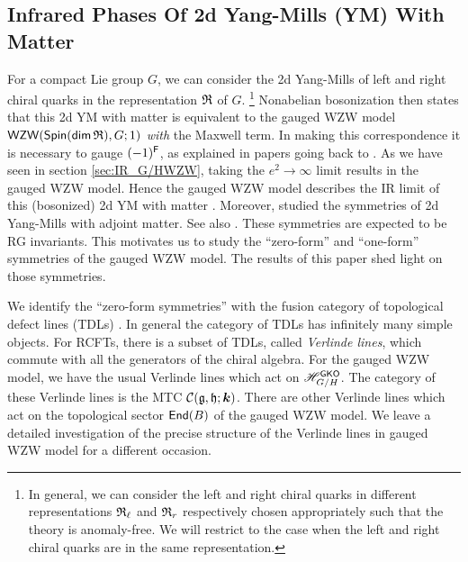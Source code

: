 \documentclass[a4paper,11pt]{article}
\newcommand{\bk}{\bm{k}}
\newcommand{\tsf}[1]{\textsf{#1}}
\def\CC {{\cal C}}
\def\fg{\mathfrak{g}}
\def\fh{\mathfrak{h}}
\def\rem{$\clubsuit$}
\newcommand{\cg}[1]{\marginpar{\raggedright \tiny \rem #1 \rem}} %
\begin{document}
\subsection{Infrared Phases Of 2d Yang-Mills (\tsf{YM}) With Matter}\label{sec:2dQCD}

For a compact Lie group $G$, we can consider the 2d Yang-Mills of left and right chiral quarks in the representation $\mathfrak{R}$ of $G$.
%
\footnote{In general, we can consider the left and right chiral quarks in different representations $\mathfrak{R}_{\ell}$ and $\mathfrak{R}_r$ respectively chosen appropriately such that the theory is anomaly-free. We will restrict to the case when the left and right chiral quarks are in the same representation.}
%
Nonabelian bosonization \cite{Witten:1983ar} then states that this 2d \tsf{YM} with matter is equivalent to the gauged \tsf{WZW} model $\mathsf{WZW}(\mathsf{Spin}(\mathsf{dim}\,\mathfrak{R}),G;1)$ \textit{with} the Maxwell term. In making this correspondence 
it is necessary to gauge  $(-1)^{\mathsf{F}}$,  as explained in papers going back to 
\cite{Alvarez-Gaume:1986nqf,Alvarez-Gaume:1987wwg,Elitzur:1986ye}. 
As we have seen in section \ref{sec:IR_G/HWZW}, taking the $e^2\to\infty$ limit results in the gauged \tsf{WZW} model. Hence the gauged \tsf{WZW} model describes the \tsf{IR} limit of this (bosonized) 2d \tsf{YM} with matter \cite{Delmastro:2021otj,Komargodski:2020mxz}. Moreover, 
\cite{Komargodski:2020mxz} studied the symmetries of 2d Yang-Mills with adjoint matter. See also \cite{Nguyen:2021naa,Cherman:2019hbq,Huang:2021zvu}. 
These symmetries are expected to be \tsf{RG} invariants.
This motivates us to study the ``zero-form'' and ``one-form'' symmetries of the gauged \tsf{WZW} model. The results of this paper shed light on those symmetries. \par 





%
%
%
%
%

We identify the ``zero-form symmetries'' with the fusion category of topological defect lines (\tsf{TDL}s) \cite{Chang:2018iay}. In general the category of \tsf{TDL}s has infinitely many simple objects. For \tsf{RCFT}s, there is a subset of \tsf{TDL}s, called \textit{Verlinde lines}, which commute with all the generators of the chiral algebra. For the gauged \tsf{WZW} model, we have the usual Verlinde lines which act on $\mathscr{H}_{G/H}^{\mathsf{GKO}}$. The category of these Verlinde lines is the \tsf{MTC} $\CC(\fg,\fh;\bk)$. There are other Verlinde lines which act on the topological sector $\mathsf{End}(B)$ of the gauged \tsf{WZW} model. We leave a detailed investigation of the precise structure of the Verlinde lines in gauged \tsf{WZW} model for a different occasion.    
\end{document}
